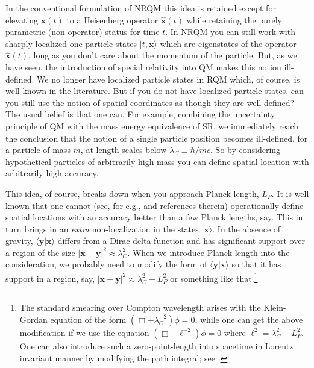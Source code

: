 \documentclass[12pt]{article}
\def\ket#1{|#1\rangle}                    %
\def\amp#1#2{\langle #1 | #2\rangle}      %
\begin{document}
In the conventional formulation of NRQM this idea is retained except for elevating $\bm{x}(t)$ to a Heisenberg operator $\hat{\bm{x}} (t)$ while retaining the purely parametric  (non-operator) status for time $t$. In NRQM you can still work with sharply localized one-particle states $\ket{t,\bm{x}}$ which are eigenstates of the operator $\hat{\bm{x}}(t)$, long as you don't care about the momentum of the particle. 
But, as we have seen,  the introduction of special relativity into QM makes this notion ill-defined. We no longer have localized particle states in RQM which, of course, is well known in the literature. But if you do not have localized particle states, can you still use the notion of spatial coordinates as though they are well-defined? The usual belief is that one can. For example, combining  the uncertainty principle of QM with the mass energy equivalence of SR, we immediately reach the conclusion that the notion of a single particle position becomes ill-defined, for a particle of mass $m$, at length scales below $\lambda_C \equiv \hbar/mc$.
So by considering hypothetical particles of arbitrarily high mass you can define spatial location with arbitrarily high accuracy. 

This idea, of course, breaks down when you approach Planck length, $L_P$. It is well known that one cannot (see, for e.g., \cite{tplp2,tplp1} and references therein) operationally define spatial locations with an accuracy better than a few Planck lengths, say. This in turn brings in an \textit{extra} non-localization  in the states $\ket{\bm{x}}$. In the absence of gravity, $\amp{\bm{y}}{\bm{x}}$ differs from a Dirac delta function and has significant support over a region of the size $|\bm{x}-\bm{y}|^2 \approx \lambda_C^2$. When we introduce Planck length into the consideration, we probably need to modify the form of  $\amp{\bm{y}}{\bm{x}}$ so that it has support in a region, say, $|\bm{x}-\bm{y}|^2 \approx \lambda_C^2+ L_P^2$ or something like that.\footnote{The standard smearing over Compton wavelength arises with the Klein-Gordan equation of the form $(\Box + \lambda_C^{-2})\phi =0$, while one can get the above modification if we use the equation $(\Box + \ell^{-2})\phi =0$ where $\ell^2 = \lambda_C^2 + L_P^2$. One can also introduce such a zero-point-length into spacetime in Lorentz invariant manner by modifying the path integral; see \cite{pid1,pid2}.} 
\end{document}
